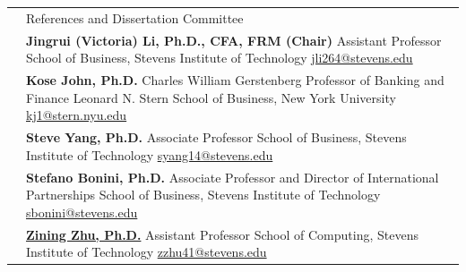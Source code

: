 \documentclass[letterpaper, 11pt]{article}
\newcommand{\headingfont}{\Large\color{OliveGreen}}
\newenvironment{SectionTable}[1]{
	\renewcommand*{\arraystretch}{1.55}
	\setlength{\tabcolsep}{10pt}
	\begin{longtable}{Rp{5.45in}} & #1 \\}
{\end{longtable}\vspace{-.3cm}}
\begin{document}
\begin{SectionTable}{\headingfont References and Dissertation Committee}
& \textbf{Jingrui (Victoria) Li, Ph.D., CFA, FRM (Chair)} \newline
Assistant Professor \newline
School of Business, Stevens Institute of Technology \newline
\href{mailto:jli264@stevens.edu}{jli264@stevens.edu} \\

& \textbf{Kose John, Ph.D.} \newline
Charles William Gerstenberg Professor of Banking and Finance \newline
Leonard N. Stern School of Business, New York University \newline
\href{mailto:kj1@stern.nyu.edu}{kj1@stern.nyu.edu} \\

& \textbf{Steve Yang, Ph.D.} \newline
Associate Professor \newline
School of Business, Stevens Institute of Technology \newline
\href{mailto:syang14@stevens.edu}{syang14@stevens.edu} \\

& \textbf{Stefano Bonini, Ph.D.} \newline
Associate Professor and Director of International Partnerships \newline
School of Business, Stevens Institute of Technology \newline
\href{mailto:sbonini@stevens.edu}{sbonini@stevens.edu} \\

& \textbf{\href{https://www.stevens.edu/profile/zzhu41}{Zining Zhu, Ph.D.}} \newline
Assistant Professor \newline
School of Computing, Stevens Institute of Technology \newline
\href{mailto:zzhu41@stevens.edu}{zzhu41@stevens.edu} \\
\end{SectionTable}



\end{document}
